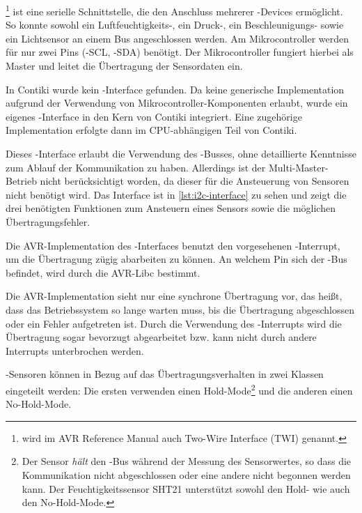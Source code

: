 	\ItC\footnote{\ItC wird im AVR Reference Manual \autocite{atmega128rfa1}
		auch Two-Wire Interface (TWI) genannt.}
	ist eine serielle Schnittstelle, die den Anschluss mehrerer
	\ItC-Devices ermöglicht. So konnte sowohl ein Luftfeuchtigkeits-,
	ein Druck-, ein Beschleunigungs- sowie ein Lichtsensor an einem Bus
	angeschlossen werden. Am Mikrocontroller werden für \ItC nur zwei Pins
	(\ItC-SCL, \ItC-SDA) benötigt. Der Mikrocontroller fungiert hierbei als
	Master und leitet die Übertragung der Sensordaten ein.

	In Contiki wurde kein \ItC-Interface gefunden. Da \ItC keine generische
	Implementation aufgrund der Verwendung von Mikrocontroller-Komponenten
	erlaubt, wurde ein eigenes \ItC-Interface in den Kern von Contiki
	integriert. Eine zugehörige Implementation erfolgte dann im
	CPU-abhängigen Teil von Contiki.

	Dieses \ItC-Interface erlaubt die Verwendung des \ItC-Busses,
	ohne detaillierte Kenntnisse zum Ablauf der Kommunikation zu haben.
	Allerdings ist der Multi-Master-Betrieb nicht berücksichtigt worden,
	da dieser für die Ansteuerung von Sensoren nicht benötigt wird.
	Das Interface ist in \autoref{lst:i2c-interface} zu sehen und zeigt
	die drei benötigten Funktionen zum Ansteuern eines Sensors
	sowie die möglichen Übertragungsfehler.

	

	Die AVR-Implementation des \ItC-Interfaces benutzt den vorgesehenen
	\ItC-Interrupt, um die Übertragung zügig abarbeiten zu können.
	An welchem Pin sich der \ItC-Bus befindet, wird durch die AVR-Libc
	bestimmt.

	Die AVR-Implementation sieht nur eine synchrone Übertragung vor,
	das heißt, dass das Betriebssystem so lange warten muss, bis die Übertragung
	abgeschlossen oder ein Fehler aufgetreten ist. Durch die Verwendung
	des \ItC-Interrupts wird die Übertragung sogar bevorzugt abgearbeitet
	bzw. kann \idR nicht durch andere Interrupts unterbrochen werden.

	\ItC-Sensoren können in Bezug auf das Übertragungsverhalten
	in zwei Klassen eingeteilt werden:
	Die ersten verwenden einen
	Hold-Mode\footnote{Der Sensor \emph{hält} den \ItC-Bus während der
		Messung des Sensorwertes, so dass die Kommunikation nicht
		abgeschlossen oder eine andere nicht begonnen werden kann.
		Der Feuchtigkeitssensor SHT21 unterstützt sowohl den Hold-
		wie auch den No-Hold-Mode.}
	und die anderen einen No-Hold-Mode.
	
